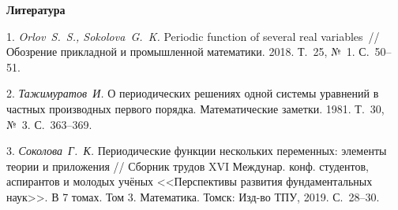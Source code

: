 \smallskip \centerline {\bf Литература} \nopagebreak

1. {\it Orlov~S.~S., Sokolova~G.~K.} Periodic function of several real variables~// Обозрение прикладной и промышленной математики. 2018. Т.~25, №~1. С.~50--51.

2. {\it Тажимуратов~И.} О периодических решениях одной системы уравнений в частных производных первого порядка. Математические заметки. 1981. Т.~30, №~3. С.~363--369.

3. {\it Соколова~Г.~К.} Периодические функции нескольких переменных: элементы теории и приложения // Сборник трудов XVI Междунар. конф. студентов, аспирантов и молодых учёных <<Перспективы развития фундаментальных наук>>. В 7 томах. Том 3. Математика. Томск: Изд-во ТПУ, 2019. С.~28--30.

